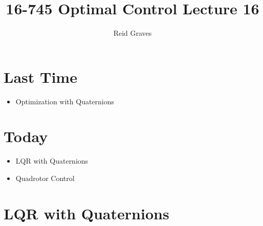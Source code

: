 \documentclass[11pt]{article}
\title{16-745 Optimal Control Lecture 16}
\author{Reid Graves}
\begin{document}
\maketitle

\section{Last Time}
\begin{itemize}
    \item Optimization with Quaternions
\end{itemize}

\section{Today}
\begin{itemize}
    \item LQR with Quaternions
    \item Quadrotor Control
\end{itemize}


\section{LQR with Quaternions}
\end{document}
